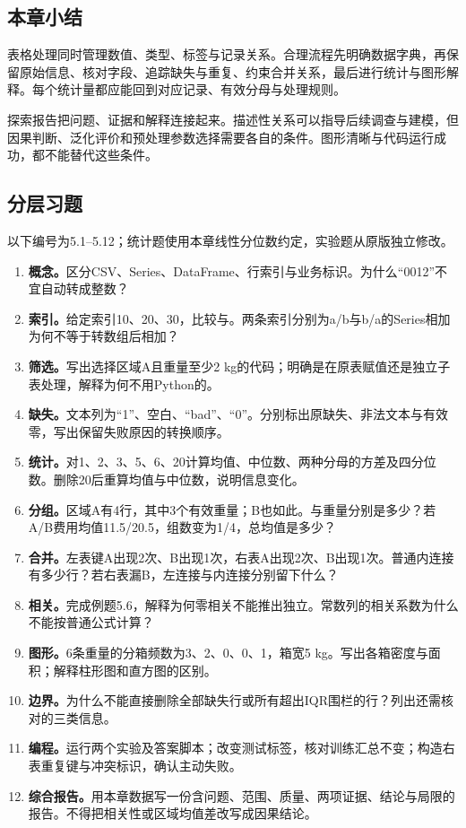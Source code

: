 \documentclass[UTF8,fontset=none,zihao=-4,a4paper]{ctexart}
\newcommand{\code}[1]{\texttt{\detokenize{#1}}}
\numberwithin{equation}{section}
\numberwithin{figure}{section}
\begin{document}
\subsection{本章小结}
表格处理同时管理数值、类型、标签与记录关系。合理流程先明确数据字典，再保留原始信息、核对字段、追踪缺失与重复、约束合并关系，最后进行统计与图形解释。每个统计量都应能回到对应记录、有效分母与处理规则。

探索报告把问题、证据和解释连接起来。描述性关系可以指导后续调查与建模，但因果判断、泛化评价和预处理参数选择需要各自的条件。图形清晰与代码运行成功，都不能替代这些条件。

\clearpage
\subsection{分层习题}
以下编号为5.1--5.12；统计题使用本章线性分位数约定，实验题从原版独立修改。
\begin{enumerate}[label=\textbf{5.\arabic*}]
\item \textbf{概念。}区分CSV、Series、DataFrame、行索引与业务标识。为什么“0012”不宜自动转成整数？
\item \textbf{索引。}给定索引10、20、30，比较\code{loc[10:20]}与\code{iloc[0:2]}。两条索引分别为a/b与b/a的Series相加为何不等于转数组后相加？
\item \textbf{筛选。}写出选择区域A且重量至少2 kg的代码；明确是在原表赋值还是独立子表处理，解释为何不用Python的\code{and}。
\item \textbf{缺失。}文本列为“1”、空白、“bad”、“0”。分别标出原缺失、非法文本与有效零，写出保留失败原因的转换顺序。
\item \textbf{统计。}对1、2、3、5、6、20计算均值、中位数、两种分母的方差及四分位数。删除20后重算均值与中位数，说明信息变化。
\item \textbf{分组。}区域A有4行，其中3个有效重量；B也如此。\code{size}与重量\code{count}分别是多少？若A/B费用均值11.5/20.5，组数变为1/4，总均值是多少？
\item \textbf{合并。}左表键A出现2次、B出现1次，右表A出现2次、B出现1次。普通内连接有多少行？若右表漏B，左连接与内连接分别留下什么？
\item \textbf{相关。}完成例题5.6，解释为何零相关不能推出独立。常数列的相关系数为什么不能按普通公式计算？
\item \textbf{图形。}6条重量的分箱频数为3、2、0、0、1，箱宽5 kg。写出各箱密度与面积；解释柱形图和直方图的区别。
\item \textbf{边界。}为什么不能直接删除全部缺失行或所有超出IQR围栏的行？列出还需核对的三类信息。
\item \textbf{编程。}运行两个实验及答案脚本；改变测试标签，核对训练汇总不变；构造右表重复键与冲突标识，确认主动失败。
\item \textbf{综合报告。}用本章数据写一份含问题、范围、质量、两项证据、结论与局限的报告。不得把相关性或区域均值差改写成因果结论。
\end{enumerate}
\end{document}
